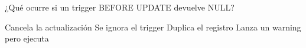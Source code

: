 \question[1] ¿Qué ocurre si un trigger BEFORE UPDATE devuelve NULL?
\begin{choices}
\CorrectChoice Cancela la actualización
\choice Se ignora el trigger
\choice Duplica el registro
\choice Lanza un warning pero ejecuta
\end{choices}